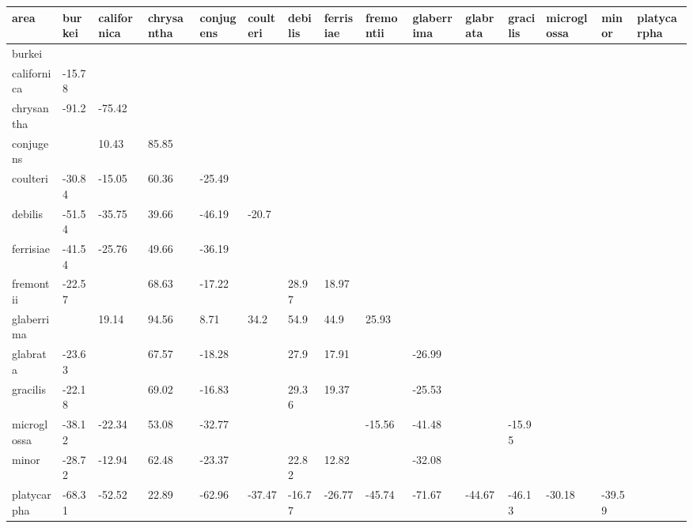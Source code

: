 \begin{table}[ht]
\centering
\begingroup\fontsize{5pt}{5pt}\selectfont
\begin{tabular}{lllllllllllllll}
  \hline
area & burkei & californica & chrysantha & conjugens & coulteri & debilis & ferrisiae & fremontii & glaberrima & glabrata & gracilis & microglossa & minor & platycarpha \\ 
  \hline
burkei &  &  &  &  &  &  &  &  &  &  &  &  &  &  \\ 
  californica & -15.78 &  &  &  &  &  &  &  &  &  &  &  &  &  \\ 
  chrysantha & -91.2 & -75.42 &  &  &  &  &  &  &  &  &  &  &  &  \\ 
  conjugens &  & 10.43 & 85.85 &  &  &  &  &  &  &  &  &  &  &  \\ 
  coulteri & -30.84 & -15.05 & 60.36 & -25.49 &  &  &  &  &  &  &  &  &  &  \\ 
  debilis & -51.54 & -35.75 & 39.66 & -46.19 & -20.7 &  &  &  &  &  &  &  &  &  \\ 
  ferrisiae & -41.54 & -25.76 & 49.66 & -36.19 &  &  &  &  &  &  &  &  &  &  \\ 
  fremontii & -22.57 &  & 68.63 & -17.22 &  & 28.97 & 18.97 &  &  &  &  &  &  &  \\ 
  glaberrima &  & 19.14 & 94.56 & 8.71 & 34.2 & 54.9 & 44.9 & 25.93 &  &  &  &  &  &  \\ 
  glabrata & -23.63 &  & 67.57 & -18.28 &  & 27.9 & 17.91 &  & -26.99 &  &  &  &  &  \\ 
  gracilis & -22.18 &  & 69.02 & -16.83 &  & 29.36 & 19.37 &  & -25.53 &  &  &  &  &  \\ 
  microglossa & -38.12 & -22.34 & 53.08 & -32.77 &  &  &  & -15.56 & -41.48 &  & -15.95 &  &  &  \\ 
  minor & -28.72 & -12.94 & 62.48 & -23.37 &  & 22.82 & 12.82 &  & -32.08 &  &  &  &  &  \\ 
  platycarpha & -68.31 & -52.52 & 22.89 & -62.96 & -37.47 & -16.77 & -26.77 & -45.74 & -71.67 & -44.67 & -46.13 & -30.18 & -39.59 &  \\ 
   \hline
\end{tabular}
\endgroup
\end{table}
